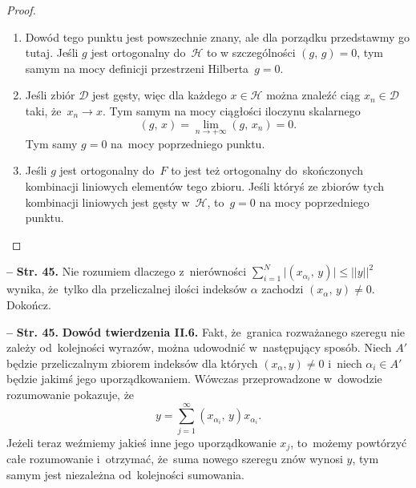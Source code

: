 \documentclass[a4paper,11pt]{article}
\newcommand{\spaceFour}{0.5em}
\newcommand{\mc}{\mathcal}
\newcommand{\ra}{\rightarrow}
\newcommand{\al}{\alpha}
\newcommand{\Dc}{\mc{D}}
\newcommand{\Hc}{\mc{H}}
\newcommand{\Lim}{\lim\limits}
\newcommand{\nToInfty}{n \ra +\infty}
\newcommand{\Sum}{\sum\limits}
\providecommand{\absj}[1]{\lvert #1 \rvert}
\newcommand{\norm}[1]{\left|\left| #1 \right|\right|}
\newcommand{\tb}{\textbf}
\newcommand{\noi}{\noindent}
\newcommand{\start}{\noi \tb{--} {}}
\newcommand{\Str}[1]{\tb{Str. #1.}}
\newcommand{\Dok}{{\color{red} Dokończ.}}
\newcommand{\SP}[2]{( #1, \, #2 )} %
\begin{document}
\begin{proof}
  \begin{enumerate}
  \item Dowód tego punktu jest powszechnie znany, ale dla porządku
    przedstawmy go tutaj. Jeśli $g$ jest ortogonalny do~$\Hc$ to w
    szczególności $\SP{ g }{ g } = 0$, tym samym na mocy definicji
    przestrzeni Hilberta~$g = 0$.
  \item Jeśli zbiór $\Dc$ jest gęsty, więc dla każdego $x \in \Hc$
    można znaleźć ciąg $x_{ n } \in \Dc$ taki, że~$x_{ n } \ra x$. Tym
    samym na mocy ciągłości iloczynu skalarnego
    \begin{equation}
      \label{eq:5}
      \SP{ g }{ x } = \Lim_{ \nToInfty } \SP{ g }{ x_{ n } } = 0.
    \end{equation}
    Tym samy $g = 0$ na~mocy poprzedniego punktu.
  \item Jeśli $g$ jest ortogonalny do~$F$ to jest też ortogonalny
    do~skończonych kombinacji liniowych elementów tego zbioru. Jeśli
    któryś ze zbiorów tych kombinacji liniowych jest gęsty w~$\Hc$,
    to~$g = 0$ na mocy poprzedniego punktu.
  \end{enumerate}
\end{proof}

\vspace{\spaceFour}


\start \Str{45} Nie rozumiem dlaczego z~nierówności
$\sum_{ i = 1 }^{ N } \absj{ \SP{ x_{ \al_{ i } } }{ y } } \leq \norm{
  y }^{ 2 }$ wynika, że~tylko dla przeliczalnej ilości indeksów $\al$
zachodzi $\SP{ x_{ \al } }{ y } \neq 0$. \Dok

\vspace{\spaceFour}


\start \Str{45} \tb{Dowód twierdzenia II.6.} Fakt, że~granica
rozważanego szeregu nie zależy od~kolejności wyrazów, można udowodnić
w~następujący sposób. Niech $A'$ będzie przeliczalnym zbiorem indeksów
dla których $( x_{ \al }, y ) \neq 0$ i~niech $\al_{ i } \in A'$
będzie jakimś jego uporządkowaniem. Wówczas przeprowadzone w~dowodzie
rozumowanie pokazuje, że
\begin{equation}
  y = \Sum_{ j = 1 }^{ \infty } \SP{ x_{ \al_{ i } } }{ y } x_{ \al_{ i } }.
\end{equation}
Jeżeli teraz weźmiemy jakieś inne jego uporządkowanie $x_{ j }$,
to~możemy powtórzyć całe rozumowanie i~otrzymać, że~suma nowego
szeregu znów wynosi $y$, tym samym jest niezależna od~kolejności
sumowania.
\end{document}
